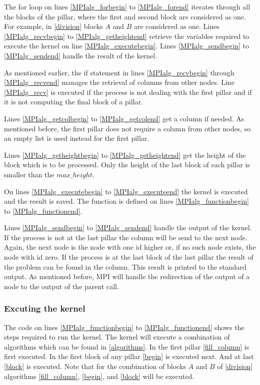 The for loop on lines \ref{MPIalg_forbegin} to \ref{MPIalg_forend} iterates through all the blocks of the pillar, where the first and second block are considered as one.
For example, in \cref{division} blocks $A$ and $B$ are considered as one.
Lines \ref{MPIalg_recvbegin} to \ref{MPIalg_getheightend} retrieve the variables required to execute the kernel on line \ref{MPIalg_executebegin}.
Lines \ref{MPIalg_sendbegin} to \ref{MPIalg_sendend} handle the result of the kernel.

As mentioned earlier, the if statement in lines \ref{MPIalg_recvbegin} through \ref{MPIalg_recvend} manages the retrieval of columns from other nodes.
Line \ref{MPIalg_recv} is executed if the process is not dealing with the first pillar and if it is not computing the final block of a pillar.

Lines \ref{MPIalg_getcolbegin} to \ref{MPIalg_getcolend} get a column if needed.
As mentioned before, the first pillar does not require a column from other nodes, so an empty list is used instead for the first pillar.

Lines \ref{MPIalg_getheightbegin} to \ref{MPIalg_getheightend} get the height of the block which is to be processed.
Only the height of the last block of each pillar is smaller than the $max\_height$.

On lines \ref{MPIalg_executebegin} to \ref{MPIalg_executeend} the kernel is executed and the result is saved.
The function is defined on lines \ref{MPIalg_functionbegin} to \ref{MPIalg_functionend}.

Lines \ref{MPIalg_sendbegin} to \ref{MPIalg_sendend} handle the output of the kernel.
If the process is not at the last pillar the column will be send to the next node.
Again, the next node is the node with one id higher or, if no such node exists, the node with id zero.
If the process is at the last block of the last pillar the result of the problem can be found in the column.
This result is printed to the standard output.
As mentioned before, MPI will handle the redirection of the output of a node to the output of the parent call.

\subsubsection{Excuting the kernel}
The code on lines \ref{MPIalg_functionbegin} to \ref{MPIalg_functionend} shows the steps required to run the kernel.
The kernel will execute a combination of algorithms which can be found in \cref{algorithms}.
In the first pillar \cref{fill_column} is first executed.
In the first block of any pillar \cref{begin} is executed next.
And at last \cref{block} is executed.
Note that for the combination of blocks $A$ and $B$ of \cref{division} algorithms \ref{fill_column}, \ref{begin}, and \ref{block} will be executed.

